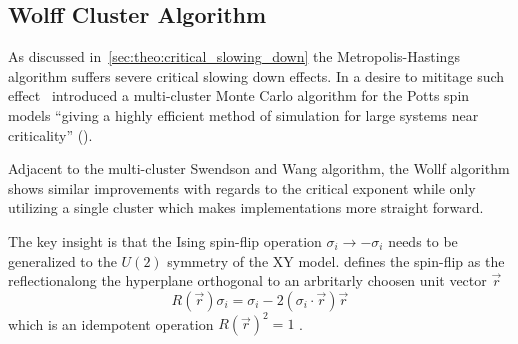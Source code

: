 	\subsection{Wolff Cluster Algorithm}\label{sec:theo:wolff_cluster}
		As discussed in~\cref{sec:theo:critical_slowing_down} the Metropolis-Hastings algorithm suffers severe critical slowing down effects. In a desire to mititage such effect~\cite{sw} introduced a multi-cluster Monte Carlo algorithm for the Potts spin models \enquote{giving a highly efficient method of simulation for large systems near criticality} (\cite{sw}).
		
		Adjacent to the multi-cluster Swendson and Wang algorithm, the Wollf algorithm shows similar improvements with regards to the critical exponent while only utilizing a single cluster which makes implementations more straight forward.
		
		The key insight is that the Ising spin-flip operation $\sigma_i \rightarrow -\sigma_i$ needs to be generalized to the $U(2)$ symmetry of the XY model. \cite{wolff} defines the spin-flip as the reflectionalong the hyperplane orthogonal to an arbritarly choosen unit vector $\vec{r}$
		\begin{equation}
			R(\vec{r}) \sigma_i = \sigma_i - 2 (\sigma_i \cdot \vec{r}) \vec{r} 
		\end{equation}
		which is an idempotent operation $R(\vec{r})^2=1$ \cite[eq. 3]{wolff}.
	
